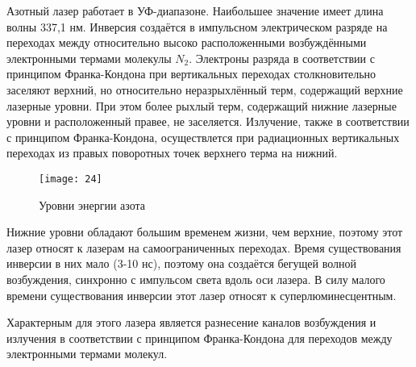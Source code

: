 Азотный лазер работает в УФ-диапазоне. Наибольшее значение имеет длина волны 
337,1 нм. Инверсия создаётся в импульсном электрическом разряде на переходах 
между относительно высоко расположенными возбуждёнными электронными термами 
молекулы \( N_2 \). Электроны разряда в соответствии с принципом 
Франка-Кондона при вертикальных переходах столкновительно заселяют верхний, 
но относительно неразрыхлённый терм, содержащий верхние лазерные уровни. При 
этом более рыхлый терм, содержащий нижние лазерные уровни и расположенный 
правее, не заселяется. Излучение, также в соответствии с принципом 
Франка-Кондона, осуществлется при радиационных вертикальных переходах из 
правых поворотных точек верхнего терма на нижний.

\begin{figure}[h]
    \center
    \texttt{[image: 24]}
    \caption{Уровни энергии азота}
\end{figure}

Нижние уровни обладают большим временем жизни, чем верхние, поэтому этот лазер 
относят к лазерам на самоограниченных переходах. Время существования инверсии 
в них мало (3-10 нс), поэтому она создаётся бегущей волной возбуждения, 
синхронно с импульсом света вдоль оси лазера. В силу малого времени 
существования инверсии этот лазер относят к суперлюминесцентным.

Характерным для этого лазера является разнесение каналов возбуждения и 
излучения в соответствии с принципом Франка-Кондона для переходов между 
электронными термами молекул.